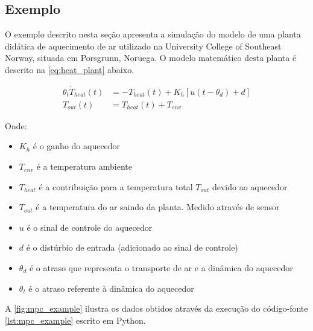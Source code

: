 
\subsection{Exemplo}
\label{subsec:mpc_example}

O exemplo descrito nesta seção apresenta a simulação do modelo de uma planta didática de aquecimento de ar
utilizado na University College of Southeast Norway, situada em Porsgrunn, Noruega. O modelo matemático
desta planta é descrito na \cref{eq:heat_plant} abaixo.

\begin{subequations}
    \label{eq:heat_plant}
    \begin{align}
        {\theta}_t \dot{T}_{heat} (t) &= -T_{heat} (t) + K_h [u(t - {\theta}_d) + d]     \\
        T_{out} (t) &= T_{heat} (t) + T_{env}
    \end{align}
\end{subequations}

\noindent
Onde: 
\begin{itemize}
	\item $K_h$ é o ganho do aquecedor
	\item $T_{env}$ é a temperatura ambiente
	\item $T_{heat}$ é a contribuição para a temperatura total $T_{out}$ devido ao aquecedor
	\item $T_{out}$ é a temperatura do ar saindo da planta. Medido através de sensor
	\item $u$ é o sinal de controle do aquecedor
	\item $d$ é o distúrbio de entrada (adicionado ao sinal de controle)
	\item ${\theta}_d$ é o atraso que representa o transporte de ar e a dinâmica do aquecedor
	\item ${\theta}_t$ é o atraso referente à dinâmica do aquecedor
\end{itemize}

A \cref{fig:mpc_example} ilustra os dados obtidos através da execução do código-fonte \ref{lst:mpc_example}
escrito em Python.

